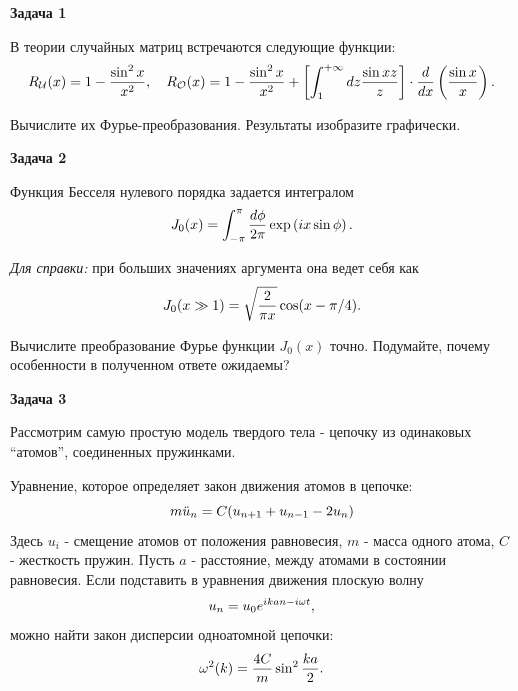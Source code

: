 \documentclass[a4paper,12pt]{article}
\begin{document}
\vspace{15pt}
\noindent \textbf{Задача 1}

\noindent

\noindent В теории случайных матриц встречаются следующие функции:
\begin{equation}\notag
R_{{\cal U}}(x)	=1-\frac{\sin^{2}x}{x^{2}},\quad R_{{\cal O}}(x)=1-\frac{\sin^{2}x}{x^{2}}+\left[\int_{1}^{+\infty}dz\frac{\sin xz}{z}\right]\cdot\frac{d}{dx}\left(\frac{\sin x}{x}\right).
\end{equation}

\noindent Вычислите их Фурье-преобразования. Результаты изобразите графически.

\vspace{15pt}
\noindent \textbf{Задача 2}

\noindent Функция Бесселя нулевого порядка задается интегралом
\begin{equation}\notag
J_{0}(x)	=\int_{-\pi}^{\pi}\frac{d\phi}{2\pi}\exp\left(ix\sin\phi\right).
\end{equation}

\noindent \textit{Для справки:} при больших значениях аргумента она ведет себя как
\begin{equation}\notag
J_{0}(x	\gg1)=\sqrt{\frac{2}{\pi x}}\cos(x-\pi/4).
\end{equation}

\noindent Вычислите преобразование Фурье функции $J_{0}(x)$ точно. Подумайте, почему особенности в полученном ответе ожидаемы?

\noindent \textbf{Задача 3}

\noindent Рассмотрим самую простую модель твердого тела - цепочку из одинаковых “атомов”, соединенных пружинками.



\noindent Уравнение, которое определяет закон движения атомов в цепочке:
\begin{equation}\notag
m\ddot{u}_{n}	=C(u_{n+1}+u_{n-1}-2u_{n})
\end{equation}
\noindent Здесь $u_{i}$ - смещение атомов от положения равновесия, $m$ - масса одного атома, $C$ - жесткость пружин. Пусть $a$ - расстояние, между атомами в состоянии равновесия. Если подставить в уравнения движения плоскую волну
\begin{equation}\notag
u_{n}	=u_{0}e^{ikan-i\omega t},
\end{equation}
\noindent можно найти закон дисперсии одноатомной цепочки:
\begin{equation}\notag
\omega^{2}(k)	=\frac{4C}{m}\sin^{2}\frac{ka}{2}.
\end{equation}
\end{document}
